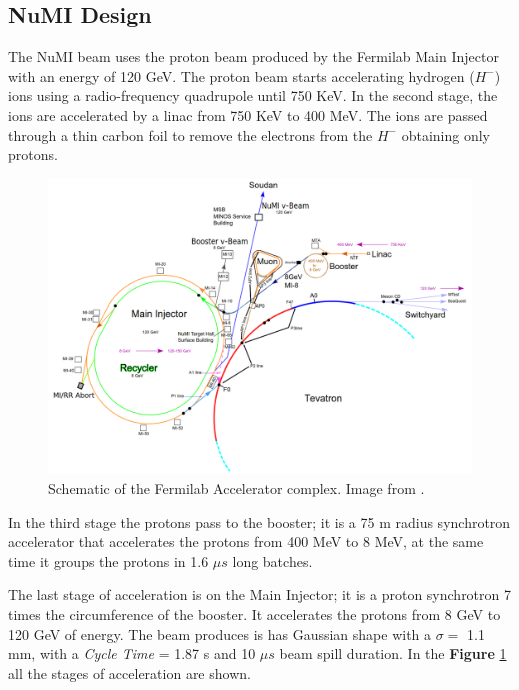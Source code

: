 \subsection{NuMI Design}

The NuMI beam uses the proton beam produced by the Fermilab Main Injector with an energy of 120 GeV. The proton beam starts accelerating hydrogen ($H^-$) ions using a radio-frequency quadrupole until 750 KeV. In the second stage, the ions are accelerated by a linac from 750 KeV to 400 MeV. The ions are passed through a thin carbon foil to remove the electrons from the $H^-$ obtaining only protons. 

\begin{figure}[!htb]
\centering
\includegraphics[scale=0.29]{Figures/Chapter2/AcceleratorComplex.png}
        \caption{Schematic of the Fermilab Accelerator complex. Image from \cite{Numi}.} 
\label{fig:MnvExp:NuMI:SchematicMainInjector}
\end{figure}

In the third stage the protons pass to the booster; it is a 75 m radius synchrotron accelerator that accelerates the protons from 400 MeV to 8 MeV, at the same time it groups the protons in 1.6 $\mu s$ long batches. 

The last stage of acceleration is on the Main Injector; it is a proton synchrotron 7 times the circumference of the booster. It accelerates the protons from 8 GeV to 120 GeV of energy. The beam produces is has Gaussian shape with a $\sigma =$ 1.1 mm, with a \textit{Cycle Time} = 1.87 s and 10 $\mu s$ beam spill duration. In the  \textbf{Figure} \ref{fig:MnvExp:NuMI:SchematicMainInjector} all the stages of acceleration are shown.

